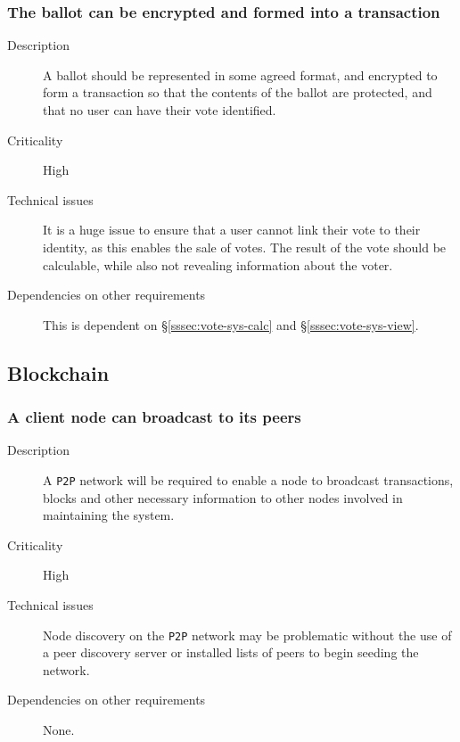 \documentclass[a4paper,12pt]{article}
\begin{document}
\subsubsection{The ballot can be encrypted and formed into a transaction}
\label{sssec:ballot-enc-trans}
\begin{description}
	\item[Description]
		A ballot should be represented in some agreed format, and encrypted to form a transaction so that the contents of the ballot are protected, and that no user can have their vote identified.
	\item[Criticality]
		High
	\item[Technical issues]
		It is a huge issue to ensure that a user cannot link their vote to their identity, as this enables the sale of votes. The result of the vote should be calculable, while also not revealing information about the voter.
	\item[Dependencies on other requirements]
		This is dependent on \S\ref{sssec:vote-sys-calc} and \S\ref{sssec:vote-sys-view}.
\end{description}

\subsection{Blockchain}
\label{subsec:blockchain}

\subsubsection{A client node can broadcast to its peers}
\label{sssec:blk-comms}
\begin{description}
	\item[Description]
		A \texttt{P2P} network will be required to enable a node to broadcast transactions, blocks and other necessary information to other nodes involved in maintaining the system.
	\item[Criticality]
		High
	\item[Technical issues]
		Node discovery on the \texttt{P2P} network may be problematic without the use of a peer discovery server or installed lists of peers to begin seeding the network.
	\item[Dependencies on other requirements]
		None.
\end{description}
\end{document}
